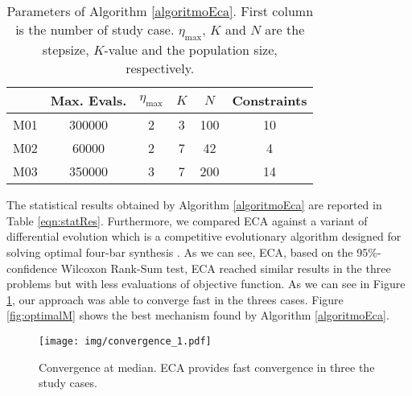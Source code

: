 \documentclass[12pt,letterpape]{article}
\begin{document}
\begin{table}[!ht]
	\centering
	\begin{tabular}{cccccc}
		    & Max. Evals. & $\eta_{\max}$ & $K$ & $N$ & Constraints \\ \hline
		M01 &   300000    &     2         &  3  & 100 & 10\\
		M02 &    60000    &     2         &  7  & 42  & 4 \\
		M03 &   350000    &     3         &  7  & 200 & 14\\
	\end{tabular}
	\caption{Parameters of Algorithm \ref{algoritmoEca}. First column is the number
	of study case. $\eta_{\max}$, $K$ and $N$ are the stepsize, $K$-value and the
	population size, respectively.}
	\label{tab:parms}
\end{table}

The statistical results obtained by Algorithm \ref{algoritmoEca} are reported in
Table \ref{eqn:statRes}. Furthermore, we compared ECA against a variant of differential
evolution \cite{ed1995} which is a competitive evolutionary algorithm designed for solving
optimal four-bar synthesis \cite{hernandez2016}. As we can see, ECA, based on the 95\%-confidence
Wilcoxon Rank-Sum test, ECA reached similar results in the three problems but with
less evaluations of objective function. As we can see in Figure \ref{fig:convMedian1},
our approach was able to converge fast in the threes cases.
Figure \ref{fig:optimalM} shows the best mechanism found by Algorithm \ref{algoritmoEca}.

\begin{figure}[!ht]
	\centering
	\texttt{[image: img/convergence\_1.pdf]}
	\caption{Convergence at median. ECA provides fast convergence in three the study cases.}
	\label{fig:convMedian1}
\end{figure}



		
\end{document}
